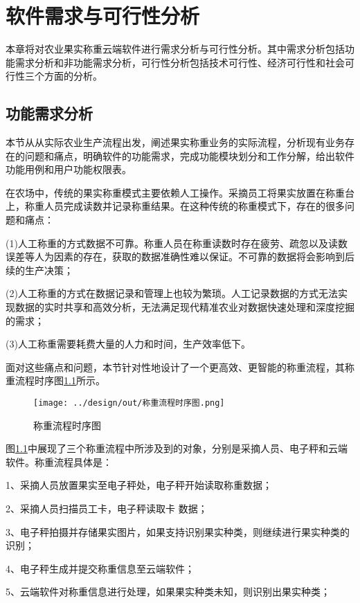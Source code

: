 \chapter{软件需求与可行性分析}

本章将对农业果实称重云端软件进行需求分析与可行性分析。其中需求分析包括功能需求分析和非功能需求分析，可行性分析包括技术可行性、经济可行性和社会可行性三个方面的分析。

\section{功能需求分析}\label{sec:req1}

本节从从实际农业生产流程出发，阐述果实称重业务的实际流程，分析现有业务存在的问题和痛点，明确软件的功能需求，完成功能模块划分和工作分解，给出软件功能用例和用户功能权限表。

在农场中，传统的果实称重模式主要依赖人工操作。采摘员工将果实放置在称重台上，称重人员完成读数并记录称重结果。在这种传统的称重模式下，存在的很多问题和痛点：

(1)人工称重的方式数据不可靠。称重人员在称重读数时存在疲劳、疏忽以及读数误差等人为因素的存在，获取的数据准确性难以保证。不可靠的数据将会影响到后续的生产决策；

(2)人工称重的方式在数据记录和管理上也较为繁琐。人工记录数据的方式无法实现数据的实时共享和高效分析，无法满足现代精准农业对数据快速处理和深度挖掘的需求；

(3)人工称重需要耗费大量的人力和时间，生产效率低下。

面对这些痛点和问题，本节针对性地设计了一个更高效、更智能的称重流程，其称重流程时序图\ref{fig:称重流程时序图}所示。

\begin{figure}
    \centering
    \texttt{[image: ../design/out/称重流程时序图.png]}
    \caption{称重流程时序图}
    \label{fig:称重流程时序图}
\end{figure}

图\ref{fig:称重流程时序图}中展现了三个称重流程中所涉及到的对象，分别是采摘人员、电子秤和云端软件。称重流程具体是：

1、采摘人员放置果实至电子秤处，电子秤开始读取称重数据；

2、采摘人员扫描员工卡，电子秤读取卡
数据；

3、电子秤拍摄并存储果实图片，如果支持识别果实种类，则继续进行果实种类的识别；

4、电子秤生成并提交称重信息至云端软件；

5、云端软件对称重信息进行处理，如果果实种类未知，则识别出果实种类；

